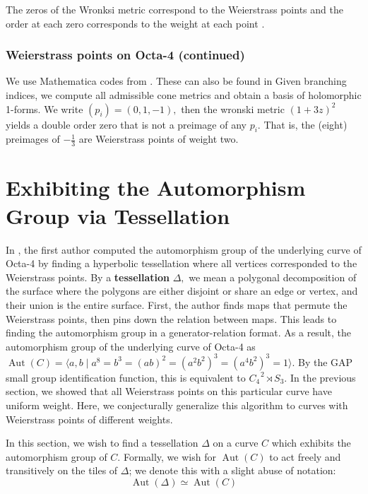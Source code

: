 \documentclass[12pt,reqno]{amsart}
\DeclareMathOperator{\Aut}{Aut}
\theoremstyle{definition}
\theoremstyle{remark}
\begin{document}
The zeros of the Wronksi metric correspond to the Weierstrass points and the order at each zero corresponds to the weight at each point \cite{fk}. 

\subsubsection*{Weierstrass points on Octa-4 (continued)} We use Mathematica codes from \cite{dthesis}. These can also be found in \cite{code:wronski} Given branching indices, we compute all admissible cone metrics and obtain a basis of holomorphic 1-forms. We write $(p_i) = (0, 1, -1),$ then the wronski metric $(1 + 3 z)^2$ yields a double order zero that is not a preimage of any $p_i.$ That is, the (eight) preimages of $- \frac{1}{3}$ are Weierstrass points of weight two. 



\section{Exhibiting the Automorphism Group via Tessellation}
\label{sec:flagflag}


In \cite{dami}, the first author computed the automorphism group of the underlying curve of Octa-4 by finding a hyperbolic tessellation where all vertices corresponded to the Weierstrass points. By a \textbf{tessellation} $\Delta,$ we mean a polygonal decomposition of the surface where the polygons are either disjoint or share an edge or vertex, and their union is the entire surface. First, the author finds maps that permute the Weierstrass points, then pins down the relation between maps. This leads to finding the automorphism group in a generator-relation format. As a result, the automorphism group of the underlying curve of Octa-4 as $\Aut(C) = \langle a, b \mid a^8 = b^3 = (ab) ^2 = (a^2b^2)^3 = (a^4b^2)^3 = 1 \rangle.$ By the GAP small group identification function, this is equivalent to $C_4^{\text{ }2} \rtimes S_3.$ In the previous section, we showed that all Weierstrass points on this particular curve have uniform weight. Here, we conjecturally generalize this algorithm to curves with Weierstrass points of different weights. 

In this section, we wish to find a tessellation $\Delta$ on a curve $C$ which exhibits the automorphism group of $C$. Formally, we wish for $\Aut(C)$ to act freely and transitively on the tiles of $\Delta$; we denote this with a slight abuse of notation:
\vspace{-3pt}
$$\Aut(\Delta) \simeq \Aut(C)$$
\end{document}

